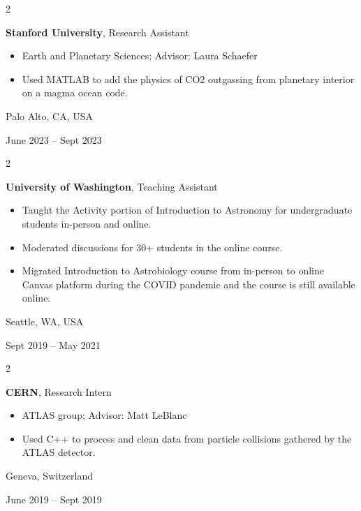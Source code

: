 \documentclass[10pt, letterpaper]{article}
\newenvironment{highlights}{
    \begin{itemize}[
        topsep=0.10 cm,
        parsep=0.10 cm,
        partopsep=0pt,
        itemsep=0pt,
        leftmargin=0.4 cm + 10pt
    ]
}{
    \end{itemize}
} %
\newenvironment{twocolentry}[2][]{
    \onecolentry
    \def\secondColumn{#2}
    \setcolumnwidth{\fill, 4.5 cm}
    \begin{paracol}{2}
}{
    \switchcolumn \raggedleft \secondColumn
    \end{paracol}
    \endonecolentry
} %
\begin{document}
        \vspace{0.2 cm}

        \begin{twocolentry}{
            Palo Alto, CA, USA

        June 2023 – Sept 2023
        }
            \textbf{Stanford University}, Research Assistant
            \begin{highlights}
                \item Earth and Planetary Sciences; Advisor: Laura Schaefer
                \item Used MATLAB to add the physics of CO2 outgassing from planetary interior on a magma ocean code.
            \end{highlights}
        \end{twocolentry}


        \vspace{0.2 cm}

        \begin{twocolentry}{
            Seattle, WA, USA

        Sept 2019 – May 2021
        }
            \textbf{University of Washington}, Teaching Assistant
            \begin{highlights}
                \item Taught the Activity portion of Introduction to Astronomy for undergraduate students in-person and online.
                \item Moderated discussions for 30+ students in the online course.
                \item Migrated Introduction to Astrobiology course from in-person to online Canvas platform during the COVID pandemic and the course is still available online.
            \end{highlights}
        \end{twocolentry}


        \vspace{0.2 cm}

        \begin{twocolentry}{
            Geneva, Switzerland

        June 2019 – Sept 2019
        }
            \textbf{CERN}, Research Intern
            \begin{highlights}
                \item ATLAS group; Advisor: Matt LeBlanc
                \item Used C++ to process and clean data from particle collisions gathered by the ATLAS detector.
            \end{highlights}
        \end{twocolentry}
\end{document}
